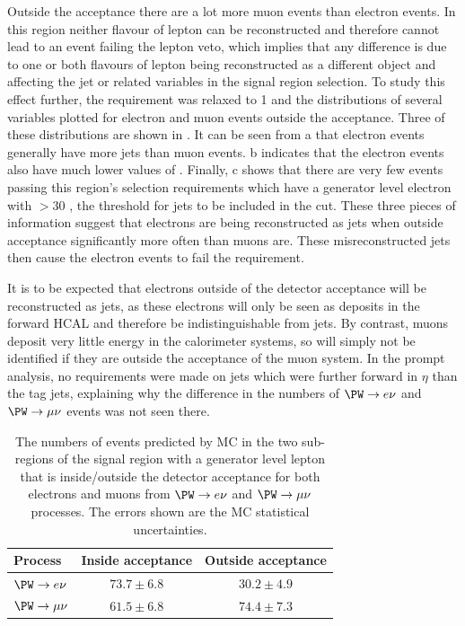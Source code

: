Outside the acceptance there are a lot more muon events than electron events. In this region neither flavour of lepton can be reconstructed and therefore cannot lead to an event failing the lepton veto, which implies that any difference is due to one or both flavours of lepton being reconstructed as a different object and affecting the jet or \MET related variables in the signal region selection. To study this effect further, the \jetmetdphi requirement was relaxed to 1 and the distributions of several variables plotted for electron and muon events outside the acceptance. Three of these distributions are shown in . It can be seen from a that electron events generally have more jets than muon events. b indicates that the electron events also have much lower values of \jetmetdphi. Finally, c shows that there are very few events passing this region's selection requirements which have a generator level electron with \pt$>30$ \GeV, the threshold for jets to be included in the \jetmetdphi cut. These three pieces of information suggest that electrons are being reconstructed as jets when outside acceptance significantly more often than muons are. These misreconstructed jets then cause the electron events to fail the \jetmetdphi requirement.

It is to be expected that electrons outside of the detector acceptance will be reconstructed as jets, as these electrons will only be seen as deposits in the forward \ac{HCAL} and therefore be indistinguishable from jets. By contrast, muons deposit very little energy in the calorimeter systems, so will simply not be identified if they are outside the acceptance of the muon system. In the prompt analysis, no requirements were made on jets which were further forward in $\eta$ than the tag jets, explaining why the difference in the numbers of $\PW\rightarrow e\nu$ and $\PW\rightarrow\mu\nu$ events was not seen there.

\begin{table}
  \caption{The numbers of events predicted by \ac{MC} in the two sub-regions of the signal region with a generator level lepton that is inside/outside the detector acceptance for both electrons and muons from $\PW\rightarrow e\nu$ and $\PW\rightarrow\mu\nu$ processes. The errors shown are the \ac{MC} statistical uncertainties.}
  \label{tab:enumunudiff}
  \begin{tabular}{lcc}
    \hline
    \hline
    Process & Inside acceptance & Outside acceptance \\
    \hline
    $\PW\rightarrow e\nu$ & $73.7\pm 6.8$ & $30.2\pm 4.9$ \\
    $\PW\rightarrow \mu\nu$ & $61.5\pm 6.8$ & $74.4\pm7.3$ \\
    \hline
    \hline
  \end{tabular}
\end{table}

